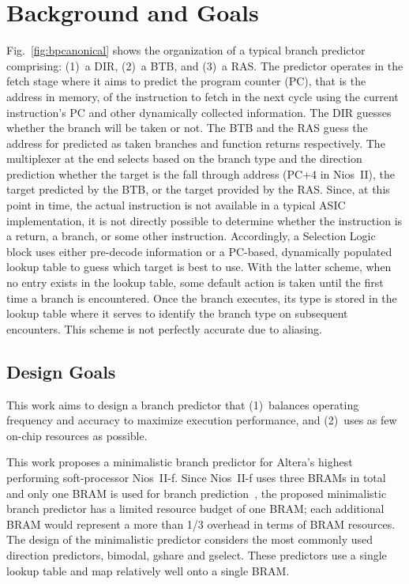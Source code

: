 \chapter{Background and Goals}

Fig.~\ref{fig:bpcanonical} shows the organization of a typical branch predictor comprising: (1)~a DIR, (2)~a BTB, and (3)~a RAS.  The predictor operates in the fetch stage where it aims to predict the program counter (PC), that is the address in memory, of the instruction to fetch in the next cycle using the current instruction's PC and other dynamically collected information. The DIR guesses whether the branch will be taken or not. The BTB and the RAS guess the address for  predicted as taken branches and function returns respectively. The multiplexer at the end selects based on the branch type and the direction prediction whether the target is the fall through address (PC+4 in Nios~II), the target predicted by the BTB, or the target provided by the RAS. Since, at this point in time, the actual instruction is not available in a typical ASIC implementation, it is not directly possible to determine whether the instruction is a return, a branch, or some other instruction. Accordingly, a Selection Logic block uses either pre-decode information or a PC-based, dynamically populated lookup table to guess which target is best to use. With the latter scheme, when no entry exists in the lookup table, some default action is taken until the first time a branch is encountered. Once the branch executes, its type is stored in the lookup table where it serves to identify the branch type on subsequent encounters. This scheme is not perfectly accurate due to aliasing.


\section{Design Goals}
\label{sec:goal}

This work aims to design a branch predictor that (1)~balances operating frequency and accuracy to maximize execution performance, and (2)~uses as few on-chip resources as possible.

This work proposes a minimalistic branch predictor for Altera's highest performing soft-processor Nios~II-f. Since Nios~II-f uses three BRAMs in total and only one BRAM is used for branch prediction~\cite{niosiif}, the proposed minimalistic branch predictor has a limited resource budget of one BRAM; each additional BRAM would represent a more than 1/3 overhead in terms of BRAM resources. The design of the minimalistic predictor considers the most commonly used direction predictors, bimodal, gshare and gselect. These predictors use a single lookup table and map relatively well onto a single BRAM.

